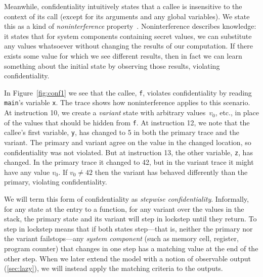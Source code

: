 \documentclass[acmsmall,review,anonymous]{acmart}\settopmatter{printfolios=true,printccs=false,printacmref=false}
\begin{document}
Meanwhile, confidentiality intuitively states that a callee is insensitive to
the context of its call (except for its arguments and any global
variables).
We state this as a kind of {\em noninterference} property~\citep{Goguen1982SecurityPA}.
Noninterference describes knowledge: it states that for system components
containing secret values, we can substitute any values whatsoever without changing the results
of our computation. If there exists some value for which we see different results, then
in fact we can learn something about the initial state by observing those results, violating
confidentiality.

In Figure~\ref{fig:conf1} we see that the callee, {\tt f}, violates confidentiality
by reading {\tt main}'s variable {\tt x}. The trace
shows how noninterference applies to this scenario. At instruction 10, we create a {\em variant}
state with arbitrary values\ifaftersubmission{}\fi~\(v_0\), etc., in place of the values that should
be hidden from {\tt f}. At instruction 12, we note that the callee's first variable, {\tt y}, has
changed to 5 in both the primary trace and the variant. The primary and variant agree on
the value in the changed location, so confidentiality was not violated. But at instruction 13,
the other variable, {\tt z}, has changed. In the primary trace it changed to 42, but
in the variant trace it might have any value \(v_0\). If \(v_0 \neq 42\) then the variant
has behaved differently than the primary, violating confidentiality.

We will term this form of confidentiality as {\em stepwise confidentiality}. Informally,
for any state at the entry to a function, for any variant over the values in the stack,
the primary state and its variant will step in lockstep until they return. To step in lockstep
means that if both states step---that is, neither the primary nor the variant failstops---any
{\em system component} (such as memory cell, register, program counter) that changes
in one step has a matching value at the end of the other step.
When we later extend the model with a notion of observable output (\cref{sec:lazy}),  we will instead apply the matching
criteria to the outputs.

\end{document}
